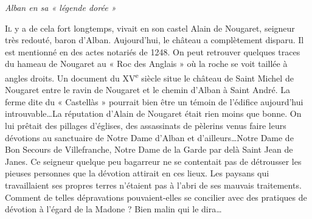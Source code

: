 \newpage

\begin{center}
    {\Large\itshape Alban en sa « légende dorée »}
\end{center}

\vspace{1.2em}

\lettrine[lines=3,lhang=0.1,nindent=0em]{I}{l} y a de cela fort longtemps, vivait en son castel Alain de Nougaret, seigneur très redouté, baron d'Alban. Aujourd'hui, le château a complètement disparu. Il est mentionné en des actes notariés de 1248. On peut retrouver quelques traces du hameau de Nougaret au « Roc des Anglais » où la roche se voit taillée à angles droits. Un document du XV\textsuperscript{e} siècle situe le château de Saint Michel de Nougaret entre le ravin de Nougaret et le chemin d'Alban à Saint André. La ferme dite du « Castellàs » pourrait bien être un témoin de l'édifice aujourd'hui introuvable\ldots La réputation d'Alain de Nougaret était rien moins que bonne. On lui prêtait des pillages d'églises, des assassinats de pèlerins venus faire leurs dévotions au sanctuaire de Notre Dame d'Alban et d'ailleurs\ldots Notre Dame de Bon Secours de Villefranche, Notre Dame de la Garde par delà Saint Jean de Janes. Ce seigneur quelque peu bagarreur ne se contentait pas de détrousser les pieuses personnes que la dévotion attirait en ces lieux. Les paysans qui travaillaient ses propres terres n'étaient pas à l'abri de ses mauvais traitements. Comment de telles dépravations pouvaient-elles se concilier avec des pratiques de dévotion à l'égard de la Madone ? Bien malin qui le dira\ldots
